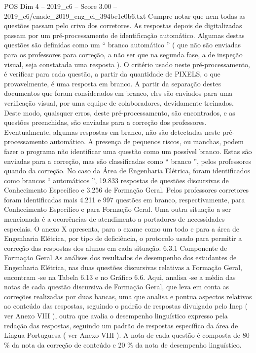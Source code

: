 \begin{textsample}{POS Dim 4 – 2019\_c6 – Score 3.00 – 2019\_c6/enade\_2019\_eng\_el\_394be1c0b6.txt}
Cumpre notar que nem todas as questões passam pelo crivo dos corretores.
As respostas depois de digitalizadas passam por um pré-processamento de identificação automático.
Algumas destas questões são definidas como um “ branco automático ” ( que não são enviadas para os professores para correção, a não ser que na segunda fase, a de inspeção visual, seja constatada uma resposta ).
O critério usado neste pré-processamento, é verificar para cada questão, a partir da quantidade de PIXELS, o que provavelmente, é uma resposta em branco.
A partir da separação destes documentos que foram considerados em branco, eles são enviados para uma verificação visual, por uma equipe de colaboradores, devidamente treinados.
Deste modo, quaisquer erros, deste pré-processamento, são encontrados, e as questões preenchidas, são enviadas para a correção dos professores.
Eventualmente, algumas respostas em branco, não são detectadas neste pré-processamento automático.
A presença de pequenos riscos, ou manchas, podem fazer o programa não identificar uma questão como um possível branco.
Estas são enviadas para a correção, mas são classificadas como “ branco ”, pelos professores quando da correção.
No caso da Área de Engenharia Elétrica, foram identificados como brancos “ automáticos ”, 19.833 respostas de questões discursivas de Conhecimento Específico e 3.256 de Formação Geral.
Pelos professores corretores foram identificadas mais 4.211 e 997 questões em branco, respectivamente, para Conhecimento Específico e para Formação Geral.
Uma outra situação a ser mencionada é a ocorrências de atendimento a portadores de necessidades especiais.
O anexo X apresenta, para o exame como um todo e para a área de Engenharia Elétrica, por tipo de deficiência, o protocolo usado para permitir a correção das respostas dos alunos em cada situação. 6.3.1 Componente de Formação Geral As análises dos resultados de desempenho dos estudantes de Engenharia Elétrica, nas duas questões discursivas relativas a Formação Geral, encontram -se na Tabela 6.13 e no Gráfico 6.6.
Aqui, analisa -se a média das notas de cada questão discursiva de Formação Geral, que leva em conta as correções realizadas por duas bancas, uma que analisa e pontua aspectos relativos ao conteúdo das respostas, seguindo o padrão de respostas divulgado pelo Inep ( ver Anexo VIII ), outra que avalia o desempenho linguístico expresso pela redação das respostas, seguindo um padrão de respostas específico da área de Língua Portuguesa ( ver Anexo VIII ).
A nota de cada questão é composta de 80 \% da nota da correção de conteúdo e 20 \% da nota de desempenho linguístico.

\end{textsample}

